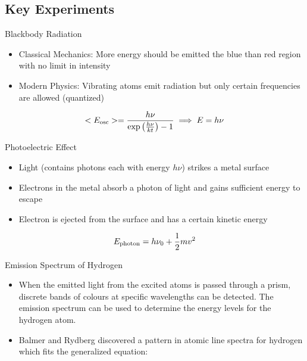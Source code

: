 \documentclass[11pt,fleqn]{book}
\begin{document}
\subsection*{Key Experiments}
\begin{descriptions}
    \item[Blackbody Radiation]
    \begin{descriptions}
    \end{descriptions}
    \begin{itemize}
        \item Classical Mechanics: More energy should be emitted the blue than red region with no limit in intensity
        \item Modern Physics: Vibrating atoms emit radiation but only certain frequencies are allowed (quantized)
    \end{itemize}
    \begin{proposition}
        $$<E_{\rm osc}>=\frac{h\nu}{\exp{\left(\frac{h\nu}{kt}\right)}-1}\implies E=h\nu$$
    \end{proposition}
    \item[Photoelectric Effect] 
    \begin{descriptions}
    \end{descriptions}
    \begin{itemize}
        \item Light (contains photons each with energy $h\nu$) strikes a metal surface
        \item Electrons in the metal absorb a photon of light and gains sufficient energy to escape
        \item Electron is ejected from the surface and has a certain kinetic energy
    \end{itemize}
    \begin{proposition}
        $$E_{\rm photon}=h\nu_0+\frac{1}{2}mv^2$$
    \end{proposition}
    \item[Emission Spectrum of Hydrogen] 
    \begin{descriptions}
    \end{descriptions}
    \begin{itemize}
        \item When the emitted light from the excited atoms is passed through a prism, discrete bands of colours at specific wavelengths can be detected. The emission spectrum can be used to determine the energy levels for the hydrogen atom. 
        \item Balmer and Rydberg discovered a pattern in atomic line spectra for hydrogen which fits the generalized equation: 

\end{itemize}
\end{descriptions}
\end{document}
